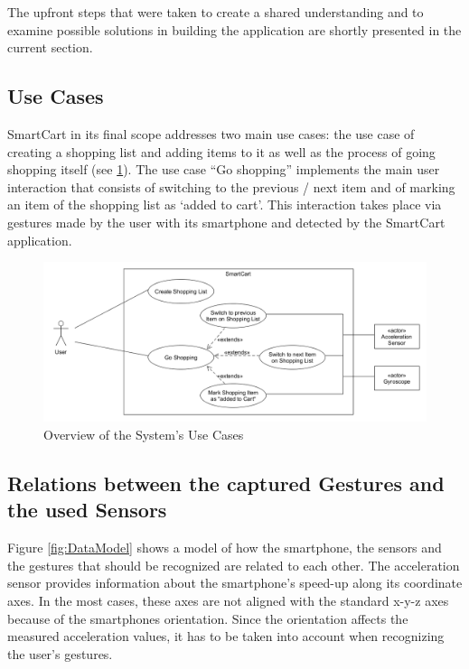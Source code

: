 The upfront steps that were taken to create a shared understanding and to
examine possible solutions in building the application are shortly presented in
the current section.

\subsection{Use Cases}
SmartCart in its final scope addresses two main use cases: the use case of
creating a shopping list and adding items to it as well as the process of going
shopping itself (see \ref{fig:UseCases}). The use case ``Go shopping''
implements the main user interaction that consists of switching to the previous / next item and of
marking an item of the shopping list as `added to cart'. This interaction takes
place via gestures made by the user with its smartphone and detected by the
SmartCart application.

\begin{figure}
\centering
\captionsetup{justification=centering}
\includegraphics[width=\textwidth]{res/sa/useCaseDiagram.png}
\caption{Overview of the System's Use Cases}
\label{fig:UseCases}
\end{figure}

\subsection{Relations between the captured Gestures
and the used Sensors}

Figure \ref{fig:DataModel} shows a model of how the smartphone, the sensors and
the gestures that should be recognized are related to each other. The
acceleration sensor provides information about the smartphone's speed-up along
its coordinate axes. In the most cases, these axes are not aligned with the
standard x-y-z axes because of the smartphones orientation. Since the
orientation affects the measured acceleration values, it has to be taken into
account when recognizing the user's gestures.

